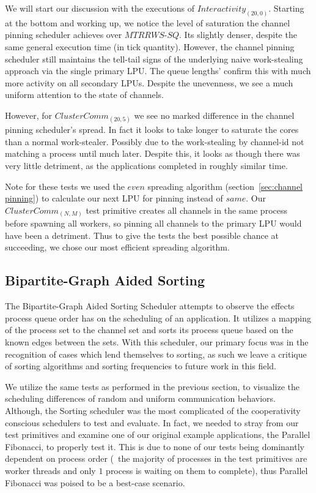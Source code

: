 We will start our discussion with the executions of $Interactivity_{(20,0)}$.
Starting at the bottom and working up, we notice the level of saturation the 
channel pinning scheduler achieves over $MTRRWS$-$SQ$. Its slightly denser,
despite the same general execution time (in tick quantity). However, the channel
pinning scheduler still maintains the tell-tail signs of the underlying 
naive work-stealing approach via the single primary LPU. The queue lengths'
confirm this with much more activity on all secondary LPUs. Despite the 
unevenness, we see a much uniform attention to the state of channels.

However, for $ClusterComm_{(20,5)}$ we see no marked difference in the channel
pinning scheduler's spread. In fact it looks to take longer to saturate the 
cores than a normal work-stealer. Possibly due to the work-stealing by channel-id
not matching a process until much later. Despite this, it looks as though there 
was very little detriment, as the applications completed in roughly similar time.

Note for these tests we used the $even$ spreading algorithm 
(section~\ref{sec:channel pinning}) to calculate our next LPU for pinning instead of
$same$. Our $ClusterComm_{(N,M)}$ test primitive creates all channels in the same
process before spawning all workers, so pinning all channels to the primary LPU 
would have been a detriment. Thus to give the tests the best possible chance
at succeeding, we chose our most efficient spreading algorithm.

\subsection{Bipartite-Graph Aided Sorting}\label{sec:results-smartsort}

The Bipartite-Graph Aided Sorting Scheduler attempts to observe the effects
process queue order has on the scheduling of an application. It utilizes a mapping
of the process set to the channel set and sorts its process queue based on 
the known edges between the sets. With this scheduler, our primary focus was
in the recognition of cases which lend themselves to sorting, as such we 
leave a critique of sorting algorithms and sorting frequencies to future work
in this field.

We utilize the same tests as performed in the previous section, to visualize the
scheduling differences of random and uniform communication behaviors. 
Although, the Sorting scheduler was the most complicated of the cooperativity 
conscious schedulers to test and evaluate. In fact, we needed to stray from our 
test primitives and examine one of our original example applications, the 
Parallel Fibonacci, to properly test it. This is due to none of our tests
being dominantly dependent on process order (\ie~the majority of processes in the
test primitives are worker threads and only $1$ process is waiting on them to
complete), thus Parallel Fibonacci was poised to be a best-case scenario.

